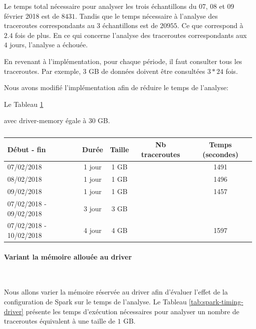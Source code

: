 Le temps total nécessaire pour analyser les trois échantillons du 07, 08 et 09 février 2018 est de $ 8431 $. Tandis que le temps nécessaire à l'analyse des traceroutes correspondants au 3 échantillons est de $20955$. Ce que correspond à $ 2.4 $ fois de plus.
En ce qui concerne l'analyse des traceroutes correspondants aux $ 4 $ jours,  l'analyse a échouée. 

En revenant à l'implémentation, pour chaque période, il faut consulter tous les traceroutes. Par exemple, 3 GB de données doivent être consultées $ 3 * 24 $ fois.


Nous avons modifié l'implémentation afin de réduire le temps de l'analyse:

Le Tableau 	\ref{tab:spark-timing-reajustedcode}

avec driver-memory égale à 30 GB.

\begin{table}[H]
	\begin{tabular}{lcccc}
		\textbf{Début - fin} &\textbf{Durée}  & \textbf{Taille}  & \textbf{Nb traceroutes} & \textbf{Temps (secondes)} \\ \hline
		
		07/02/2018&1 jour&1 GB&& 1491\\ \hline
		08/02/2018&1 jour&1 GB&& 1496 \\ \hline
		09/02/2018&1 jour& 1 GB&& 1457 \\ \hline
		07/02/2018 - 09/02/2018&3 jour& 3 GB&& \\ \hline
		07/02/2018 - 10/02/2018&4 jour& 4 GB& & 1597  \\ \hline
	\end{tabular}
	\caption{}
	\label{tab:spark-timing-reajustedcode}
\end{table}


\paragraph{Variant la mémoire allouée au driver}~

Nous allons varier la mémoire réservée au driver afin d'évaluer l'effet de la configuration de Spark sur le temps de l'analyse. Le Tableau 	\ref{tab:spark-timing-driver} présente les temps d'exécution nécessaires pour analyser un nombre de traceroutes équivalent à une taille de $ 1 $ GB. 

